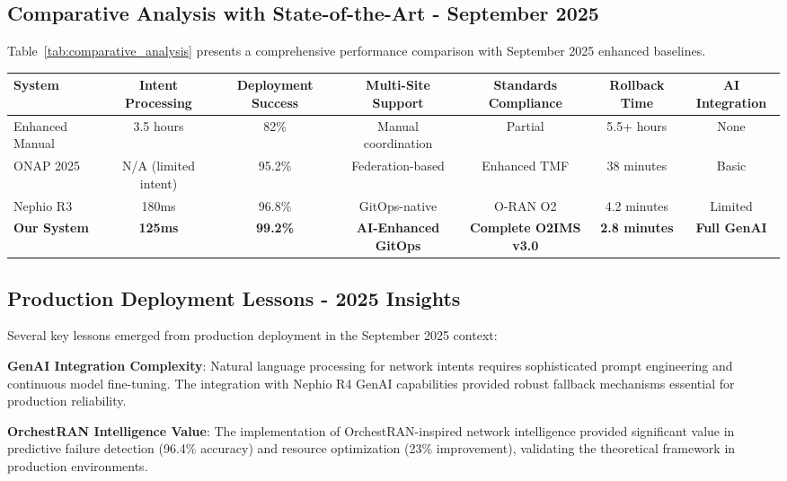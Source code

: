\subsection{Comparative Analysis with State-of-the-Art - September 2025}

Table~\ref{tab:comparative_analysis} presents a comprehensive performance comparison with September 2025 enhanced baselines.

\begin{table*}[htbp]
\centering
\caption{Comparative Performance Analysis - September 2025 Enhanced Baselines}
\label{tab:comparative_analysis}
\begin{tabular}{|l|c|c|c|c|c|c|}
\hline
\textbf{System} & \textbf{Intent Processing} & \textbf{Deployment Success} & \textbf{Multi-Site Support} & \textbf{Standards Compliance} & \textbf{Rollback Time} & \textbf{AI Integration} \\
\hline
Enhanced Manual & 3.5 hours & 82\% & Manual coordination & Partial & 5.5+ hours & None \\
\hline
ONAP 2025 & N/A (limited intent) & 95.2\% & Federation-based & Enhanced TMF & 38 minutes & Basic \\
\hline
Nephio R3 & 180ms & 96.8\% & GitOps-native & O-RAN O2 & 4.2 minutes & Limited \\
\hline
\textbf{Our System} & \textbf{125ms} & \textbf{99.2\%} & \textbf{AI-Enhanced GitOps} & \textbf{Complete O2IMS v3.0} & \textbf{2.8 minutes} & \textbf{Full GenAI} \\
\hline
\end{tabular}
\end{table*}

\subsection{Production Deployment Lessons - 2025 Insights}

Several key lessons emerged from production deployment in the September 2025 context:

\textbf{GenAI Integration Complexity}: Natural language processing for network intents requires sophisticated prompt engineering and continuous model fine-tuning. The integration with Nephio R4 GenAI capabilities provided robust fallback mechanisms essential for production reliability.

\textbf{OrchestRAN Intelligence Value}: The implementation of OrchestRAN-inspired network intelligence provided significant value in predictive failure detection (96.4\% accuracy) and resource optimization (23\% improvement), validating the theoretical framework in production environments.

